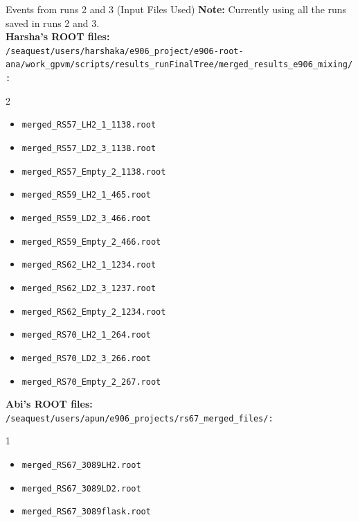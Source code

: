 \documentclass[aspectratio=169]{beamer}
\begin{document}
\begin{frame}{Events from runs 2 and 3 (Input Files Used)}
\textbf{Note:} Currently using all the runs saved in runs 2 and 3.
\vspace{0.3cm}
\tiny\\
\textbf{Harsha's ROOT files:} \\
\texttt{/seaquest/users/harshaka/e906\_project/e906-root-ana/work\_gpvm/scripts/results\_runFinalTree/merged\_results\_e906\_mixing/:}
\begin{multicols}{2}
\begin{itemize}
    \item \texttt{merged\_RS57\_LH2\_1\_1138.root}
    \item \texttt{merged\_RS57\_LD2\_3\_1138.root}
    \item \texttt{merged\_RS57\_Empty\_2\_1138.root}
    \item \texttt{merged\_RS59\_LH2\_1\_465.root}
    \item \texttt{merged\_RS59\_LD2\_3\_466.root}
    \item \texttt{merged\_RS59\_Empty\_2\_466.root}
    \item \texttt{merged\_RS62\_LH2\_1\_1234.root}
    \item \texttt{merged\_RS62\_LD2\_3\_1237.root}
    \item \texttt{merged\_RS62\_Empty\_2\_1234.root}
    \item \texttt{merged\_RS70\_LH2\_1\_264.root}
    \item \texttt{merged\_RS70\_LD2\_3\_266.root}
    \item \texttt{merged\_RS70\_Empty\_2\_267.root}
\end{itemize}
\end{multicols}
\textbf{Abi's ROOT files:} \\
\texttt{/seaquest/users/apun/e906\_projects/rs67\_merged\_files/:}
\begin{multicols}{1}
\begin{itemize}
    \item \texttt{merged\_RS67\_3089LH2.root}
    \item \texttt{merged\_RS67\_3089LD2.root}
    \item \texttt{merged\_RS67\_3089flask.root}
\end{itemize}
\end{multicols}

\normalsize
\end{frame}
\end{document}
